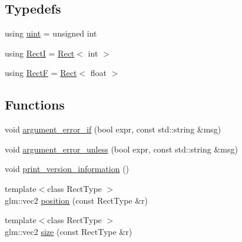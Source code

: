 \subsection*{Typedefs}
\begin{DoxyCompactItemize}
\item 
using \hyperlink{namespacepixel_a6706355faabffaabebd430b2fa55843a}{uint} = unsigned int
\item 
using \hyperlink{namespacepixel_a011b6ca4edb82531cde9d358b2caa10c}{RectI} = \hyperlink{classpixel_1_1_rect}{Rect}$<$ int $>$
\item 
using \hyperlink{namespacepixel_aebc99b06b2550630ffed4e1efe9fef13}{RectF} = \hyperlink{classpixel_1_1_rect}{Rect}$<$ float $>$
\end{DoxyCompactItemize}
\subsection*{Functions}
\begin{DoxyCompactItemize}
\item 
void \hyperlink{namespacepixel_a58ea4609722bf807288c38aa6e00dd70}{argument\+\_\+error\+\_\+if} (bool expr, const std\+::string \&msg)
\item 
void \hyperlink{namespacepixel_a1f9d784c476fcab7016ed79d33af82d2}{argument\+\_\+error\+\_\+unless} (bool expr, const std\+::string \&msg)
\item 
void \hyperlink{namespacepixel_aec54bf5377667d69e7716ae8894787af}{print\+\_\+version\+\_\+information} ()
\item 
{\footnotesize template$<$class Rect\+Type $>$ }\\glm\+::vec2 \hyperlink{namespacepixel_ad650304c53730cbc06bddfa4486c54db}{position} (const Rect\+Type \&r)
\item 
{\footnotesize template$<$class Rect\+Type $>$ }\\glm\+::vec2 \hyperlink{namespacepixel_a465745e3b1a334686475c629948876f0}{size} (const Rect\+Type \&r)
\end{DoxyCompactItemize}
